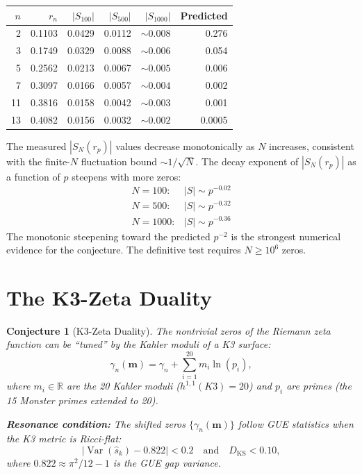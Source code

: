 \documentclass[11pt]{amsart}
\newtheorem{conjecture}[theorem]{Conjecture}
\theoremstyle{definition}
\begin{document}
\begin{center}
\begin{tabular}{r r r r r r}
\toprule
$n$ & $r_n$ & $|S_{100}|$ & $|S_{500}|$ & $|S_{1000}|$ & Predicted \\
\midrule
2 & 0.1103 & 0.0429 & 0.0112 & $\sim 0.008$ & 0.276 \\
3 & 0.1749 & 0.0329 & 0.0088 & $\sim 0.006$ & 0.054 \\
5 & 0.2562 & 0.0213 & 0.0067 & $\sim 0.005$ & 0.006 \\
7 & 0.3097 & 0.0166 & 0.0057 & $\sim 0.004$ & 0.002 \\
11 & 0.3816 & 0.0158 & 0.0042 & $\sim 0.003$ & 0.001 \\
13 & 0.4082 & 0.0156 & 0.0032 & $\sim 0.002$ & 0.0005 \\
\bottomrule
\end{tabular}
\end{center}

The measured $|S_N(r_p)|$ values decrease monotonically as $N$ increases, consistent with the finite-$N$ fluctuation bound $\sim 1/\sqrt{N}$. The decay exponent of $|S_N(r_p)|$ as a function of $p$ steepens with more zeros:
\[
\begin{array}{rcl}
N = 100: & |S| \sim p^{-0.02} \\
N = 500: & |S| \sim p^{-0.32} \\
N = 1000: & |S| \sim p^{-0.36}
\end{array}
\]
The monotonic steepening toward the predicted $p^{-2}$ is the strongest numerical evidence for the conjecture. The definitive test requires $N \geq 10^6$ zeros.


\section{The K3-Zeta Duality}
\label{sec:k3}

\begin{conjecture}[K3-Zeta Duality]\label{conj:k3}
The nontrivial zeros of the Riemann zeta function can be ``tuned'' by the Kahler moduli of a K3 surface:
\[
\gamma_n(\mathbf{m}) = \gamma_n + \sum_{i=1}^{20} m_i \ln(p_i),
\]
where $m_i \in \mathbb{R}$ are the 20 Kahler moduli ($h^{1,1}(K3) = 20$) and $p_i$ are primes (the 15 Monster primes extended to 20).

\textbf{Resonance condition:} The shifted zeros $\{\gamma_n(\mathbf{m})\}$ follow GUE statistics when the K3 metric is Ricci-flat:
\[
|\operatorname{Var}(\hat{s}_k) - 0.822| < 0.2 \quad \text{and} \quad D_{\mathrm{KS}} < 0.10,
\]
where $0.822 \approx \pi^2/12 - 1$ is the GUE gap variance.
\end{conjecture}
\end{document}
